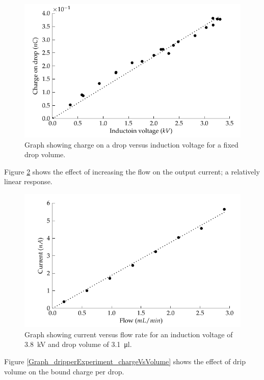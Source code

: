    \begin{figure}
        \includegraphics{content/appendices/chargedWaterDrops/graphics/dripper_chargeVsVoltage}
        \caption{\label{Figure_Graph_dripper_chargeVsVoltage}Graph showing charge on a drop versus induction voltage for a fixed drop volume.}
    \end{figure}
    Figure \ref{Figure_Graph_dripper_currentVsFlow} shows the effect of increasing the flow on the output current; a relatively linear response.
    \begin{figure}
        \centering
        \includegraphics{content/appendices/chargedWaterDrops/graphics/dripper_currentVsFlow}
        \caption{\label{Figure_Graph_dripper_currentVsFlow}Graph showing current versus flow rate for an induction voltage of \SI{3.8}{\kilo\volt} and drop volume of \SI{3.1}{\micro\litre}.}
    \end{figure}
    Figure \ref{Graph_dripperExperiment_chargeVsVolume} shows the effect of drip volume on the bound charge per drop.
